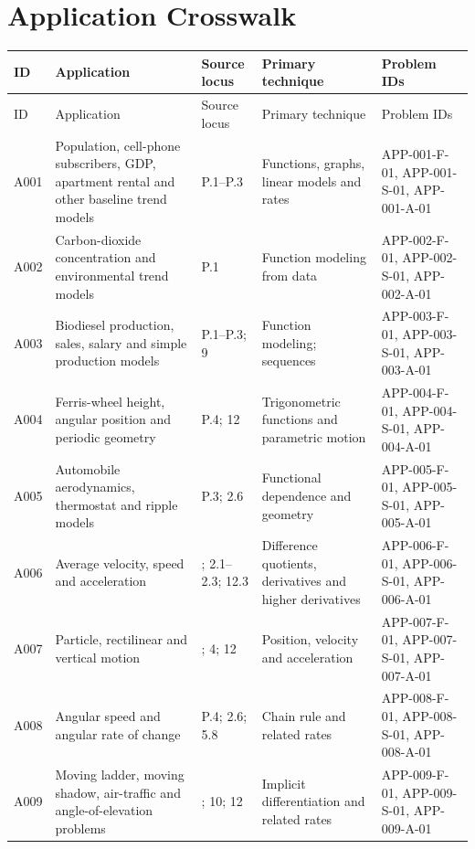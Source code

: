 \documentclass[11pt]{book}
\begin{document}
\chapter{Application Crosswalk}
\small\begin{longtable}{@{}>{\raggedright\arraybackslash}p{}>{\raggedright\arraybackslash}p{}>{\raggedright\arraybackslash}p{}>{\raggedright\arraybackslash}p{}>{\raggedright\arraybackslash}p{}@{}}\toprule
ID & Application & Source locus & Primary technique & Problem IDs \\\midrule\endfirsthead\toprule ID & Application & Source locus & Primary technique & Problem IDs \\\midrule\endhead
A001 & Population, cell-phone subscribers, GDP, apartment rental and other baseline trend models & P.1–P.3 & Functions, graphs, linear models and rates & APP-001-F-01, APP-001-S-01, APP-001-A-01  \\
A002 & Carbon-dioxide concentration and environmental trend models & P.1 & Function modeling from data & APP-002-F-01, APP-002-S-01, APP-002-A-01  \\
A003 & Biodiesel production, sales, salary and simple production models & P.1–P.3; 9 & Function modeling; sequences & APP-003-F-01, APP-003-S-01, APP-003-A-01  \\
A004 & Ferris-wheel height, angular position and periodic geometry & P.4; 12 & Trigonometric functions and parametric motion & APP-004-F-01, APP-004-S-01, APP-004-A-01  \\
A005 & Automobile aerodynamics, thermostat and ripple models & P.3; 2.6 & Functional dependence and geometry & APP-005-F-01, APP-005-S-01, APP-005-A-01  \\
A006 & Average velocity, speed and acceleration & 1; 2.1–2.3; 12.3 & Difference quotients, derivatives and higher derivatives & APP-006-F-01, APP-006-S-01, APP-006-A-01  \\
A007 & Particle, rectilinear and vertical motion & 2; 4; 12 & Position, velocity and acceleration & APP-007-F-01, APP-007-S-01, APP-007-A-01  \\
A008 & Angular speed and angular rate of change & P.4; 2.6; 5.8 & Chain rule and related rates & APP-008-F-01, APP-008-S-01, APP-008-A-01  \\
A009 & Moving ladder, moving shadow, air-traffic and angle-of-elevation problems & 2.6; 10; 12 & Implicit differentiation and related rates & APP-009-F-01, APP-009-S-01, APP-009-A-01  \\

\end{longtable}
\end{document}
